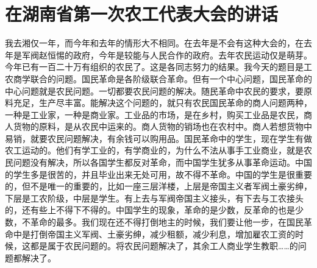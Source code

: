 \section[在湖南省第一次农工代表大会的讲话（一九二六年十二月二十日）]{在湖南省第一次农工代表大会的讲话}


我去湘仅一年，而今年和去年的情形大不相同。在去年是不会有这种大会的，在去年是军阀赵恒惕的政府，今年是较能与人民合作的政府。去年农民运动仅是萌芽。今年已有一百二十万有组织的农民了。这是各同志努力的结果。我今天的题目是工农商学联合的问题。国民革命是各阶级联合革命。但有一个中心问题，国民革命的中心问题就是农民问题。一切都要农民问题的解决。随民革命中农民的要求，要原料充足，生产尽丰富。能解决这个问题的，就只有农民国民革命的商人问题两种，一种是工业家，一种是商业家。工业品的市场，是在乡村，购买工业品是农民，商人货物的原料，是从农民中运来的。商人货物的销场也在农村中。商人若想货物中易销，就要农民问题解决，有余钱可以购用品。国民革命中的学生，现在学生有做农工运动的。他们有学工业的，有学商业的，为什么不法从事手工业商业，就是农民问题没有解决，所以各国学生都反对革命，而中国学生犹多从事革命运动。中国的学生多是很苦的，并且毕业出来无处可用，故不得不革命。中国的学生是很重要的，但不是唯一的重要的，比如一座三层洋楼，上层是帝国主义者军阀土豪劣绅，下层是工农阶级，中层是学生。有上去与军阀帝国主义接头，有下去与工农接头的，还有些上不得下不得的。中国学生的现象，革命的是少数，反革命的也是少数，不革命的最多。我们现在还不得打倒地主的时候，我们要让他一步，在国民革命中是打倒帝国主义军阀、土豪劣绅，减少租额，减少利息，增加雇农工资的时候，这都是属于农民问题的。将农民问题解决了，其余工人商业学生教职……的问题都解决了。

